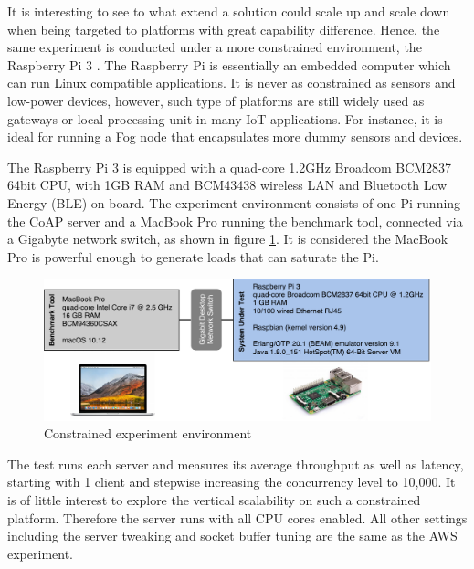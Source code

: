 It is interesting to see to what extend a solution could scale up and scale down when being targeted to platforms with great capability difference. Hence, the same experiment is conducted under a more constrained environment, the Raspberry Pi 3 \cite{raspberry_pi}. The Raspberry Pi is essentially an embedded computer which can run Linux compatible applications. It is never as constrained as sensors and low-power devices, however, such type of platforms are still widely used as gateways or local processing unit in many IoT applications. For instance, it is ideal for running a Fog node that encapsulates more dummy sensors and devices.

The Raspberry Pi 3 is equipped with a quad-core 1.2GHz Broadcom BCM2837 64bit CPU, with 1GB RAM and BCM43438 wireless LAN and Bluetooth Low Energy (BLE) on board. The experiment environment consists of one Pi running the CoAP server and a MacBook Pro running the benchmark tool, connected via a Gigabyte network switch, as shown in figure \ref{fig:experiment_setting_rasp}. It is considered the MacBook Pro is powerful enough to generate loads that can saturate the Pi. 

\begin{figure}[!htbp]
\centering
\includegraphics[scale = 0.55]{experiment_setting_rasp}
\caption{Constrained experiment environment}
\label{fig:experiment_setting_rasp}
\end{figure}

The test runs each server and measures its average throughput as well as latency, starting with 1 client and stepwise increasing the concurrency level to 10,000. It is of little interest to explore the vertical scalability on such a constrained platform. Therefore the server runs with all CPU cores enabled. All other settings including the server tweaking and socket buffer tuning are the same as the AWS experiment.

